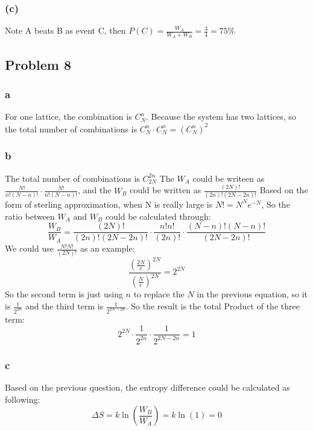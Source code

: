 \documentclass[a4paper]{article}
\begin{document}
\subsubsection{(c)}
Note A beats B as event C, then $P(C)=\frac{W_{A}}{W_{A}+W_{B}}=\frac{3}{4}=75 \%$

\subsection{Problem 8}
\subsubsection{a}
For one lattice, the combination is $C_{N}^{n}$. Because the system has two lattices, so the total number of combinations is $C_{N}^{n} \cdot C_{N}^{n} = (C_{N}^{n})^2$
\subsubsection{b}
The total number of combinations is $C_{2N}^{2n}$
The $W_{A}$ could be writeen as $\frac{N!}{n!(N-n)!}\cdot\frac{N!}{n!(N-n)!}$, and the $W_{B}$ could be written as $\frac{(2N)!}{(2n)!(2N-2n)!}$ Based on the form of sterling approximation, when N is really large is $N! = N^{N}e^{-N}$, So the ratio between $W_{A}$ and $W_{B}$ could be calculated through:
\begin{equation}
	\frac{W_{B}}{W_{A}}=\frac{(2N)!}{(2n)!(2N-2n)!}\cdot \frac{n! n!}{(2n)!}\cdot \frac{(N-n)!(N-n)!}{(2N-2n)!}
\end{equation}
We could use $\frac{N!N!}{(2N)!}$ as an example:
\begin{equation}
	\frac{(\frac{2N}{e})^{2N}}{(\frac{N}{e})^{2N}}=2^{2N}
\end{equation}
So the second term is just using $n$ to replace the $N$ in the previous equation, so it is $\frac{1}{2^{2n}}$ and the third term is $\frac{1}{2^{2N-2n}}$. 
\newline
So the result is the total Product of the three term:
\begin{equation}
	2^{2N} \cdot \frac{1}{2^{2n}} \cdot \frac{1}{2^{2N-2n}}=1
\end{equation}
\subsubsection{c}
Based on the previous question, the entropy difference could be calculated as following:
\begin{equation}
	\Delta S=k \ln (\frac{W_{B}}{W_{A}})=k \ln(1) =0
\end{equation}
\newline
\end{document}

